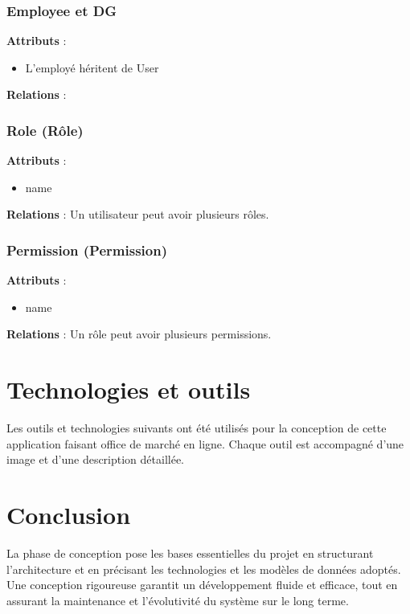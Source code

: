 \subsubsection{Employee et DG}
\textbf{Attributs} :
\begin{itemize}
    \item L'employé héritent de User
\end{itemize}
\textbf{Relations} :


\subsubsection{Role (Rôle)}
\textbf{Attributs} :
\begin{itemize}
    \item name
\end{itemize}
\textbf{Relations} : Un utilisateur peut avoir plusieurs rôles.

\subsubsection{Permission (Permission)}
\textbf{Attributs} :
\begin{itemize}
    \item name
\end{itemize}
\textbf{Relations} : Un rôle peut avoir plusieurs permissions.


\section{Technologies et outils}
Les outils et technologies suivants ont été utilisés pour la conception de cette application faisant office de marché en ligne.
Chaque outil est accompagné d'une image et d'une
description détaillée.


\section{Conclusion}
La phase de conception pose les bases essentielles du projet en structurant
l'architecture et en précisant les technologies et les modèles de données
adoptés. Une conception rigoureuse garantit un développement fluide et
efficace, tout en assurant la maintenance et l'évolutivité du système sur le
long terme.

\clearpage
